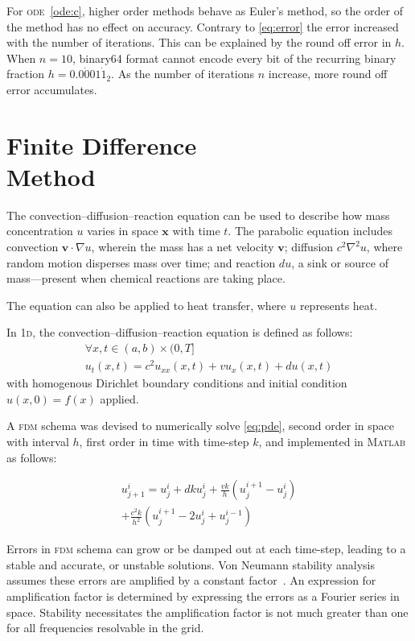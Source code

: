 \documentclass[a4paper,12pt,twocolumn]{article}
\begin{document}
For \textsc{ode}~\eqref{ode:c}, higher order methods behave as Euler's method, 
so the order of the method has no effect on accuracy. Contrary to 
\eqref{eq:error} the error increased with the number of iterations. This can be 
explained by the round off error in $h$. When $n=10$, binary64 format cannot 
encode every bit of the recurring binary fraction
\mbox{$h=0.0\dot{0}01\dot{1}_2$}. As the number of iterations $n$ increase, 
more round off error accumulates.

\section{Finite Difference\\Method}

The convection--diffusion--reaction equation can be used to describe how mass 
concentration $u$ varies in space $\mathbf{x}$ with time $t$. The parabolic 
equation includes convection $\mathbf{v}\cdot\nabla u$, wherein the mass has a 
net velocity $\mathbf{v}$; diffusion $c^2\nabla^2u$, where random motion 
disperses mass over time; and reaction $du$, a sink or source of mass---present 
when chemical reactions are taking place.

The equation can also be applied to heat transfer, where $u$ represents heat.

In \textsc{1d}, the convection--diffusion--reaction equation is defined as 
follows:
{\footnotesize
    \begin{multline} \label{eq:pde}
            \forall x,t \in (a, b) \times (0, T] \\
            u_t(x,t) = c^2u_{xx}(x,t) + vu_x(x,t) + du(x,t)
    \end{multline}
}with homogenous Dirichlet boundary conditions and initial condition 
\mbox{$u(x,0)=f(x)$} applied.

A \textsc{fdm} schema was devised to numerically solve \eqref{eq:pde}, second order in 
space with interval $h$, first order in time with time-step $k$, and 
implemented in \textsc{Matlab} as follows:
{\footnotesize
    \begin{multline} \label{eq:schema}
        u^i_{j+1} = u^i_j + dku^i_j + \frac{vk}{h}(u^{i+1}_j - u^i_j) \\
            + \frac{c^2k}{h^2}(u^{i+1}_j - 2u^i_j + u^{i-1}_j)
    \end{multline}

}Errors in \textsc{fdm} schema can grow or be damped out at each time-step,
leading to a stable and accurate, or unstable solutions. Von Neumann stability
analysis assumes these errors are amplified by a constant
factor~\cite{charney1950numerical}. An expression for amplification factor is 
determined by expressing the errors as a Fourier series in space. Stability 
necessitates the amplification factor is not much greater than one for all  frequencies resolvable in the grid.
\end{document}
